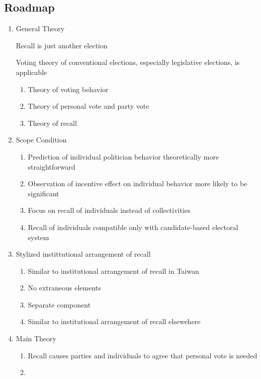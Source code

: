 \documentclass[hyphens, crop=false]{standalone}
\begin{document}
	\subsection*{Roadmap}
	\begin{enumerate}
		\item 
		General Theory
		
		Recall is just another election \autocite{mayhewCongressElectoralConnection1974}
		
		Voting theory of conventional elections, especially legislative elections, is applicable
		\begin{enumerate}
			\item 
			Theory of voting behavior
			\autocite{campbellAmericanVoter1960}
			\item 
			Theory of personal vote and party vote
			\autocite{cainPersonalVoteConstituency1987,campbellElectionsPoliticalOrder1966}
			\item 
			Theory of recall
		\end{enumerate}
		\item 
		Scope Condition
		\begin{enumerate}
			\item 
			Prediction of individual politician behavior theoretically more straightforward
			\item 
			Observation of incentive effect on individual behavior more likely to be significant
			\item 
			Focus on recall of individuals instead of collectivities
			\item 
			Recall of individuals compatible only with candidate-based electoral system
		\end{enumerate}
		\item 
		Stylized instittutional arrangement of recall
		\begin{enumerate}
			\item 
			Similar to institutional arrangement of recall in Taiwan
			\item 
			No extraneous elements
			\item 
			Separate component
			\item 
			Similar to institutional arrangement of recall elsewehere
		\end{enumerate}
		\item 
		Main Theory
		\begin{enumerate}
			\item 
			Recall causes parties and individuals to agree that personal vote is needed
			\item 

\end{enumerate}
\end{enumerate}
\end{document}
